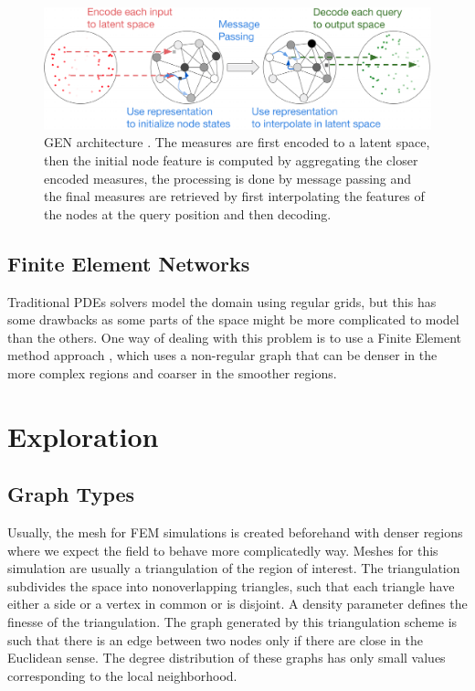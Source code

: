 \documentclass[a4paper,10pt]{article}
\begin{document}
\begin{figure}[htbp]
  \centering
  \includegraphics[width=\textwidth]{figs/GEN}
  \caption{GEN architecture \cite{alet2019gen}. The measures are first encoded to a latent space, then the initial node feature is computed by aggregating the closer encoded measures, the processing is done by message passing and the final measures are retrieved by first interpolating the features of the nodes at the query position and then decoding.}
\end{figure}

\subsection{Finite Element Networks}

Traditional PDEs solvers model the domain using regular grids, but this has some drawbacks as some parts of the space might be more complicated to model than the others. One way of dealing with this problem is to use a Finite Element method approach \cite{hughes2012finite}, which uses a non-regular graph that can be denser in the more complex regions and coarser in the smoother regions.


\section{Exploration}
\subsection{Graph Types}

Usually, the mesh for FEM simulations is created beforehand with denser regions where we expect the field to behave more complicatedly way. Meshes for this simulation are usually a triangulation of the region of interest. The triangulation subdivides the space into nonoverlapping triangles, such that each triangle have either a side or a vertex in common or is disjoint. A density parameter defines the finesse of the triangulation. The graph generated by this triangulation scheme is such that there is an edge between two nodes only if there are close in the Euclidean sense. The degree distribution of these graphs has only small values corresponding to the local neighborhood.
\end{document}
